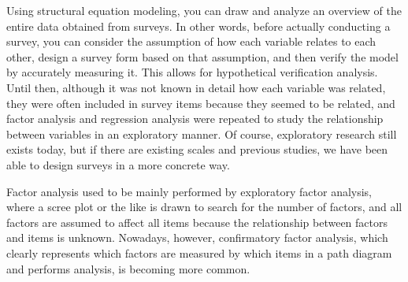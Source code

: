 \documentclass{ltjsbook}
\begin{document}
Using structural equation modeling, you can draw and analyze an overview of the entire data obtained from surveys. In other words, before actually conducting a survey, you can consider the assumption of how each variable relates to each other, design a survey form based on that assumption, and then verify the model by accurately measuring it. This allows for hypothetical verification analysis. Until then, although it was not known in detail how each variable was related, they were often included in survey items because they seemed to be related, and factor analysis and regression analysis were repeated to study the relationship between variables in an exploratory manner. Of course, exploratory research still exists today, but if there are existing scales and previous studies, we have been able to design surveys in a more concrete way.

Factor analysis used to be mainly performed by exploratory factor analysis, where a scree plot or the like is drawn to search for the number of factors, and all factors are assumed to affect all items because the relationship between factors and items is unknown. Nowadays, however, confirmatory factor analysis, which clearly represents which factors are measured by which items in a path diagram and performs analysis, is becoming more common.



\end{document}
